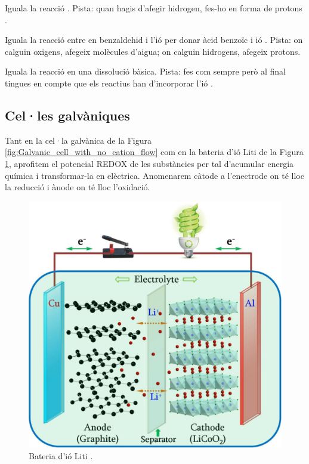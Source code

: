 \begin{exr}
Iguala la reacció . Pista: quan hagis d'afegir hidrogen, fes-ho en forma de protons .
\end{exr}

\begin{exr}
Iguala la reacció entre en benzaldehid i l'ió  per donar àcid benzoïc i ió . Pista: on calguin oxigens, afegeix molècules d'aigua; on calguin hidrogens, afegeix protons.
\end{exr}

\begin{exr}
Iguala la reacció  en una dissolució bàsica. Pista: fes com sempre però al final tingues en compte que els reactius han d'incorporar l'ió .
\end{exr}

\subsection{Cel·les galvàniques}

Tant en la cel·la galvànica de la Figura \ref{fig:Galvanic_cell_with_no_cation_flow} com en la bateria d'ió Liti de la Figura \ref{fig:LiIon3}, aprofitem el potencial REDOX de les substàncies per tal d'acumular energia química i transformar-la en elèctrica. 
Anomenarem càtode a l'enectrode on té lloc la reducció i ànode on té lloc l'oxidació.

\begin{figure}[h]
\centering
\includegraphics[scale=1]{figures/LiIon3.png}
\caption{Bateria d'ió Liti \cite{Liu2016}.}
\label{fig:LiIon3}
\end{figure}

